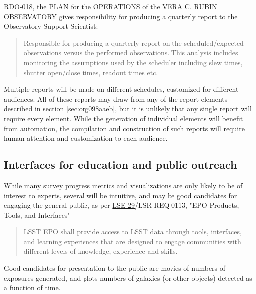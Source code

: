 RDO-018, the \href{https://docushare.lsst.org/docushare/dsweb/Get/RDO-018}{PLAN for the OPERATIONS of the VERA C. RUBIN OBSERVATORY} gives responsibility for producing a quarterly report to the Observatory Support Scientist:
\begin{quote}
Responsible for producing a quarterly report on the scheduled/expected observations versus the performed observations.
This analysis includes monitoring the assumptions used by the scheduler including slew times, shutter open/close times, readout times etc. 
\end{quote}

Multiple reports will be made on different schedules, customized for different audiences.
All of these reports may draw from any of the report elements described in section \ref{sec:org098aaeb}, but it is unlikely that any single report will require every element.
While the generation of individual elements will benefit from automation, the compilation and construction of such reports will require human attention and customization to each audience.

\subsection{Interfaces for education and public outreach}
\label{sec:org252f0f8}
While many survey progress metrics and visualizations are only likely to be of interest to experts, several will be intuitive, and may be good candidates for engaging the general public, as per \href{https://ls.st/lse-29}{LSE-29}/LSR-REQ-0113, "EPO Products, Tools, and Interfaces"
\begin{quote}
LSST EPO shall provide access to LSST data through tools, interfaces,
and learning experiences that are designed to engage communities with
different levels of knowledge, experience and skills.
\end{quote}
Good candidates for presentation to the public are movies of numbers of exposures generated, and plots numbers of galaxies (or other objects) detected as a function of time.
